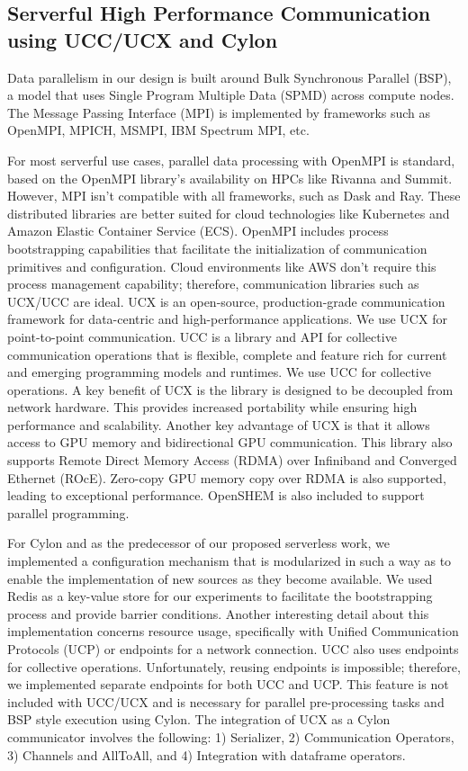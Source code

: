 \documentclass[conference]{IEEEtran}
\begin{document}
\subsection{Serverful High Performance Communication using UCC/UCX and Cylon}

Data parallelism in our design is built around Bulk Synchronous Parallel (BSP), a model that uses Single Program Multiple Data (SPMD) across compute nodes.  The Message Passing Interface (MPI) is implemented by frameworks such as OpenMPI, MPICH, MSMPI, IBM Spectrum MPI, etc.

For most serverful use cases, parallel data processing with OpenMPI is standard, based on the OpenMPI library’s availability on HPCs like Rivanna and Summit. However, MPI isn’t compatible with all frameworks, such as Dask and Ray. These distributed libraries are better suited for cloud technologies like Kubernetes and Amazon Elastic Container Service (ECS). OpenMPI includes process bootstrapping capabilities that facilitate the initialization of communication primitives and configuration. Cloud environments like AWS don't require this process management capability; therefore, communication libraries such as UCX/UCC are ideal. UCX is an open-source, production-grade communication framework for data-centric and high-performance applications\cite{UCXRepo}.   We use UCX for point-to-point communication.  UCC is a library and API for collective communication operations that is flexible, complete and feature rich for current and emerging programming models and runtimes\cite{UCCRepo}.  We use UCC for collective operations.   A key benefit of UCX is the library is designed to be decoupled from network hardware.  This provides increased portability while ensuring high performance and scalability.  Another key advantage of UCX is that it allows access to GPU memory and bidirectional GPU communication.  This library also supports Remote Direct Memory Access (RDMA) over Infiniband and Converged Ethernet (ROcE).  Zero-copy GPU memory copy over RDMA is also supported, leading to exceptional performance.  OpenSHEM is also included to support parallel programming\cite{shan2022hybrid}.

For Cylon and as the predecessor of our proposed serverless work, we implemented a configuration mechanism that is modularized in such a way as to enable the implementation of new sources as they become available. We used Redis as a key-value store for our experiments to facilitate the bootstrapping process and provide barrier conditions.
Another interesting detail about this implementation concerns resource usage, specifically with Unified Communication Protocols (UCP) or endpoints for a network connection.  UCC also uses endpoints for collective operations. Unfortunately, reusing endpoints is impossible; therefore, we implemented separate endpoints for both UCC and UCP. This feature is not included with UCC/UCX and is necessary for parallel pre-processing tasks and BSP style execution using Cylon. The integration of UCX as a Cylon communicator involves the following: 1) Serializer, 2) Communication Operators, 3) Channels and AllToAll, and 4) Integration with dataframe operators\cite{shan2022hybrid}.  
\end{document}
